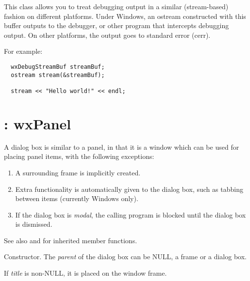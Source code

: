 This class allows you to treat debugging output in a similar
(stream-based) fashion on different platforms. Under
Windows, an ostream constructed with this buffer outputs
to the debugger, or other program that intercepts debugging
output. On other platforms, the output goes to standard error (cerr).

For example:

\begin{verbatim}
  wxDebugStreamBuf streamBuf;
  ostream stream(&streamBuf);

  stream << "Hello world!" << endl;
\end{verbatim}


\section{: wxPanel}\label{wxdialogbox}


A dialog box is similar to a panel, in that it is a window which can
be used for placing panel items, with the following exceptions:

\begin{enumerate}
\item A surrounding frame is implicitly created.
\item Extra functionality is automatically given to the dialog box,
  such as tabbing between items (currently Windows only).
\item If the dialog box is {\it modal}, the calling program is blocked
  until the dialog box is dismissed.
\end{enumerate}

See also  and  for inherited
member functions.

\label{constrdialog}


Constructor. The {\it parent} of the dialog box can be NULL, a frame or
a dialog box.

If {\it title} is non-NULL, it is placed on the window frame.

